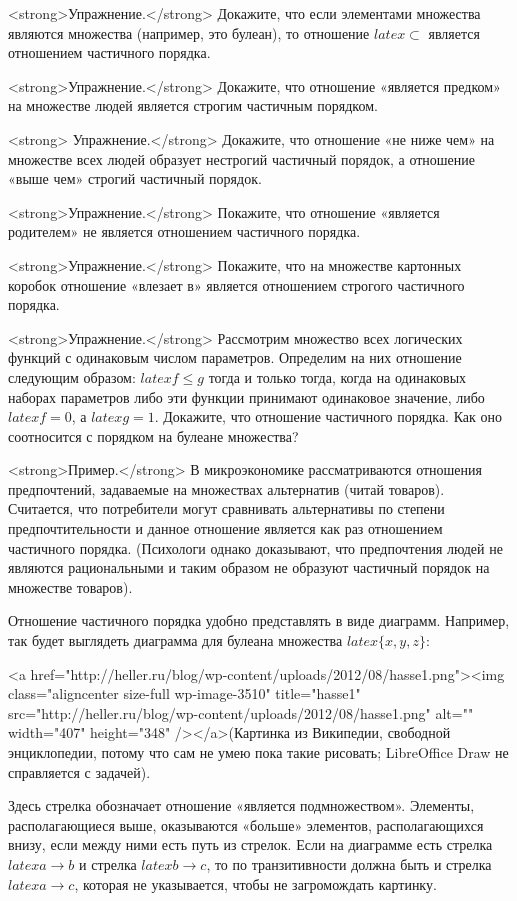 <strong>Упражнение.</strong> Докажите, что если элементами множества являются множества (например, это булеан), то отношение $latex \subset$ является отношением частичного порядка.

<strong>Упражнение.</strong> Докажите, что отношение «является предком» на множестве людей является строгим частичным порядком.

<strong> Упражнение.</strong> Докажите, что отношение «не ниже чем» на множестве всех людей образует нестрогий частичный порядок, а отношение «выше чем» строгий частичный порядок.

<strong>Упражнение.</strong> Покажите, что отношение «является родителем» не является отношением частичного порядка.

<strong>Упражнение.</strong> Покажите, что на множестве картонных коробок отношение «влезает в» является отношением строгого частичного порядка.

<strong>Упражнение.</strong> Рассмотрим множество всех логических функций с одинаковым числом параметров. Определим на них отношение следующим образом: $latex f\le g$ тогда и только тогда, когда на одинаковых наборах параметров либо эти функции принимают одинаковое значение, либо $latex f=0$, а $latex g=1$. Докажите, что отношение частичного порядка. Как оно соотносится с порядком на булеане множества?

<strong>Пример.</strong> В микроэкономике рассматриваются отношения предпочтений, задаваемые на множествах альтернатив (читай товаров). Считается, что потребители могут сравнивать альтернативы по степени предпочтительности и данное отношение является как раз отношением частичного порядка. (Психологи однако доказывают, что предпочтения людей не являются рациональными и таким образом не образуют частичный порядок на множестве товаров).

Отношение частичного порядка удобно представлять в виде диаграмм. Например, так будет выглядеть диаграмма для булеана множества $latex \{x, y, z\}$:

<a href="http://heller.ru/blog/wp-content/uploads/2012/08/hasse1.png"><img class="aligncenter size-full wp-image-3510" title="hasse1" src="http://heller.ru/blog/wp-content/uploads/2012/08/hasse1.png" alt="" width="407" height="348" /></a>(Картинка из Википедии, свободной энциклопедии, потому что сам не умею пока такие рисовать; LibreOffice Draw не справляется с задачей).

Здесь стрелка обозначает отношение «является подмножеством». Элементы, располагающиеся выше, оказываются «больше» элементов, располагающихся внизу, если между ними есть путь из стрелок. Если на диаграмме есть стрелка $latex a\to b$ и стрелка $latex b\to c$, то по транзитивности должна быть и стрелка $latex a\to c$, которая не указывается, чтобы не загромождать картинку.


